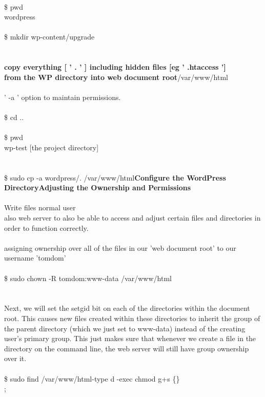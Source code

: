 \documentclass[10pt,a4paper]{article}
\begin{document}
{{{{{{{{{{{{{{{{{{\\
\$ pwd\\
wordpress\\
\\
\$ mkdir wp-content/upgrade\\
\\
\\
\textbf{copy everything [ ' . ' ] including hidden files [eg ' .htaccess '] \\
from the WP directory into web document root}}{\large /var/www/html}{\large \\
\\
' -a ' option to maintain permissions.\\
\\
\$ cd ..\\
\\
\$ pwd\\
wp-test   [the project directory]\\
\\
\\
\$ sudo cp -a wordpress/. /var/www/html}{\large \textbf{Configure the WordPress Directory}}{\large \textbf{Adjusting the Ownership and Permissions}}{\large {\large \\
\\
Write files normal user\\
also web server to also be able to access and adjust certain files and directories in order to function correctly.\\
\\
assigning ownership over all of the files in our 'web document root' to our username 'tomdom'\\
\\
\$ sudo chown -R tomdom:www-data /var/www/html}{\large {\large \\
\\
\\
Next, we will set the setgid bit on each of the directories within the document root. This causes new files created within these directories to inherit the group of the parent directory (which we just set to www-data) instead of the creating user's primary group. This just makes sure that whenever we create a file in the directory on the command line, the web server will still have group ownership over it.\\
\\
\$ sudo find /var/www/html}{\large  -type d -exec chmod g+s \{\} \\;\\
\\
}}}}}}}}}}}}}}}}}}}}
\end{document}
